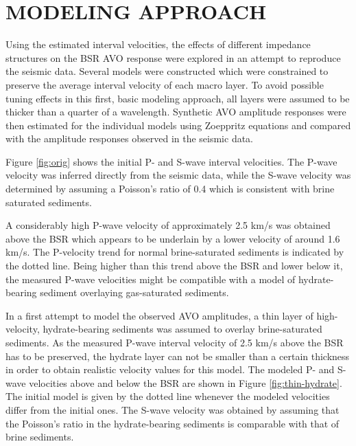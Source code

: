 


\section{MODELING APPROACH}

Using the estimated interval velocities, the effects of different impedance 
structures on the BSR AVO response were explored in an attempt to reproduce the
seismic data. Several models were constructed which were constrained to preserve
the average interval velocity of each macro layer. To avoid possible tuning
effects in this first, basic modeling approach, 
all layers were assumed to be thicker than a quarter of a wavelength.
Synthetic AVO amplitude responses were then estimated for the individual models
using Zoeppritz equations and compared with the amplitude responses observed
in the seismic data. 
\par
Figure \ref{fig:orig} shows the initial P- and S-wave interval 
velocities. The P-wave 
velocity was inferred directly from the seismic data, while the S-wave velocity
was determined by assuming a Poisson's ratio of 0.4 which is consistent with
brine saturated sediments.


A considerably high P-wave velocity of approximately 2.5 km/s
was obtained above the BSR which appears
to be underlain by a lower velocity of around 1.6 km/s.
The P-velocity trend for normal
brine-saturated sediments is indicated by the dotted line. Being 
higher than this trend above the BSR and lower below it, the measured P-wave
velocities might be compatible with a model of hydrate-bearing sediment 
overlaying gas-saturated sediments.
\par
In a first attempt to model the observed AVO amplitudes, a thin layer of 
high-velocity, hydrate-bearing sediments was assumed to overlay brine-saturated
sediments. As the measured P-wave interval velocity of 2.5 km/s above the BSR 
has to be preserved, the hydrate layer can not be smaller than a certain
thickness in
order to obtain realistic velocity values for this model. The modeled P- and
S-wave velocities above and below the BSR are shown in Figure 
\ref{fig:thin-hydrate}. The initial model is given by the dotted line whenever the
modeled velocities differ from the initial ones.
The S-wave velocity was obtained by assuming that the Poisson's ratio in the
hydrate-bearing sediments is comparable with that of brine sediments.

